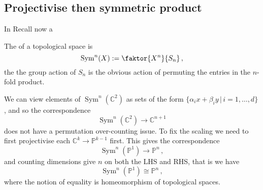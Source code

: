 \documentclass{article}
\begin{document}
\subsection{Projectivise then symmetric product}
In
Recall now a
\begin{definition}
	The  of a topological space is 
	\[
	\operatorname{Sym}^n(X) := \faktor{X^n}{S_n} \, ,
	\]
	the the group action of $S_n$ is the obvious action of permuting the entries in the $n$-fold product.  
\end{definition} 
We can view elements of $\operatorname{Sym}^n(\mathbb{C}^2)$ as sets of the form $\{\alpha_i x + \beta_i y \, | \, i=1, \dots, d\}$, and so the correspondence 
\[
	\operatorname{Sym}^n(\mathbb{C}^2) \to \mathbb{C}^{n+1}
\]
does not have a permutation over-counting issue. To fix the scaling we need to first projectivise each $\mathbb{C}^{k} \to \mathbb{P}^{k-1}$ first. This gives the correspondence 
\[
	\operatorname{Sym}^n(\mathbb{P}^1) \to \mathbb{P}^n \, ,
\]
and counting dimensions give $n$ on both the LHS and RHS, that is we have 
\begin{equation}
	\operatorname{Sym}^{n}(\mathbb{P}^1) \cong \mathbb{P}^n \, , \tag{A}
\end{equation}
where the notion of equality is homeomorphism of topological spaces. 
\end{document}
